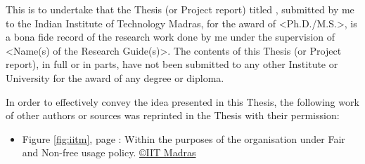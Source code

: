 \certificate

\begin{doublespace}
\noindent This is to undertake that the Thesis (or Project report) titled \MakeUppercase{\textbf{\MyTitle}}, submitted by me %
to the Indian Institute of Technology Madras, for
the award of <Ph.D./M.S.>, is a bona fide
record of the research work done by me under the supervision of <Name(s) of the Research Guide(s)>.  The contents of this Thesis (or Project report), in full or in parts, have not been submitted to any other Institute or University for the award of any degree or diploma.



In order to effectively convey the idea presented in this Thesis, the following work of other
authors or sources was reprinted in the Thesis with their permission:
\begin{itemize}
	\item Figure \ref{fig:iitm}, page \pageref{fig:iitm}: Within the purposes of the organisation under Fair and Non-free usage policy. \href{https://en.wikipedia.org/w/index.php?curid=26650718}{\copyright IIT Madras} 
\end{itemize}
\end{doublespace}

\vspace*{0.2in}

